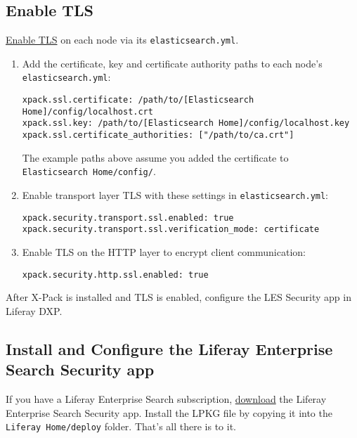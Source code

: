 \noindent\hrulefill

\subsection{Enable TLS}\label{enable-tls}

\href{https://www.elastic.co/guide/en/elasticsearch/reference/6.5/configuring-tls.html\#enable-ssl}{Enable
TLS} on each node via its \texttt{elasticsearch.yml}.

\begin{enumerate}
\def\labelenumi{\arabic{enumi}.}
\item
  Add the certificate, key and certificate authority paths to each
  node's \texttt{elasticsearch.yml}:

\begin{verbatim}
xpack.ssl.certificate: /path/to/[Elasticsearch Home]/config/localhost.crt
xpack.ssl.key: /path/to/[Elasticsearch Home]/config/localhost.key
xpack.ssl.certificate_authorities: ["/path/to/ca.crt"]
\end{verbatim}

  The example paths above assume you added the certificate to
  \texttt{Elasticsearch\ Home/config/}.
\item
  Enable transport layer TLS with these settings in
  \texttt{elasticsearch.yml}:

\begin{verbatim}
xpack.security.transport.ssl.enabled: true
xpack.security.transport.ssl.verification_mode: certificate
\end{verbatim}
\item
  Enable TLS on the HTTP layer to encrypt client communication:

\begin{verbatim}
xpack.security.http.ssl.enabled: true
\end{verbatim}
\end{enumerate}

After X-Pack is installed and TLS is enabled, configure the LES Security
app in Liferay DXP.

\subsection{Install and Configure the Liferay Enterprise Search
Security
app}\label{install-and-configure-the-liferay-enterprise-search-security-app}

If you have a Liferay Enterprise Search subscription,
\href{https://web.liferay.com/group/customer/dxp/downloads/enterprise-search}{download}
the Liferay Enterprise Search Security app. Install the LPKG file by
copying it into the \texttt{Liferay\ Home/deploy} folder. That's all
there is to it.

